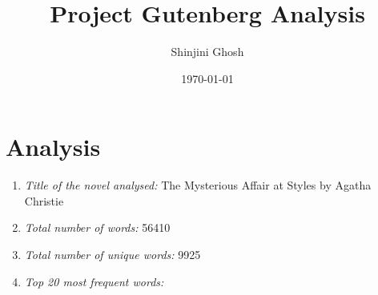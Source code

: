 \documentclass[12pt]{article}
\title{Project Gutenberg Analysis}
\author{Shinjini Ghosh}
\date{\today}
\begin{document}
\maketitle

\section*{Analysis}

\begin{enumerate}
  \item \textit{Title of the novel analysed:} The Mysterious Affair at Styles by Agatha Christie
  \item \textit{Total number of words:} 56410
  \item \textit{Total number of unique words:} 9925
  \item \textit{Top 20 most frequent words:}
\end{enumerate}
\end{document}
